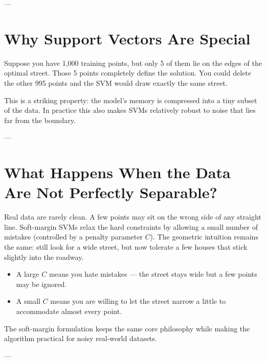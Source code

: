 \documentclass[11pt,journal,onecolumn]{IEEEtran}
\begin{document}
---

\section{Why Support Vectors Are Special}
\label{sec:support}

Suppose you have 1,000 training points, but only 5 of them lie on the edges of the optimal street. Those 5 points completely define the solution. You could delete the other 995 points and the SVM would draw exactly the same street.

This is a striking property: the model’s memory is compressed into a tiny subset of the data. In practice this also makes SVMs relatively robust to noise that lies far from the boundary.

\vspace{0.3em}
\noindent{}
\vspace{0.3em}

---

\section{What Happens When the Data Are Not Perfectly Separable?}
\label{sec:soft}

Real data are rarely clean. A few points may sit on the wrong side of any straight line. Soft-margin SVMs relax the hard constraints by allowing a small number of mistakes (controlled by a penalty parameter $C$). The geometric intuition remains the same: still look for a wide street, but now tolerate a few houses that stick slightly into the roadway.

\begin{itemize}
    \item A large $C$ means you hate mistakes --- the street stays wide but a few points may be ignored.
    \item A small $C$ means you are willing to let the street narrow a little to accommodate almost every point.
\end{itemize}

The soft-margin formulation keeps the same core philosophy while making the algorithm practical for noisy real-world datasets.

---
\end{document}
